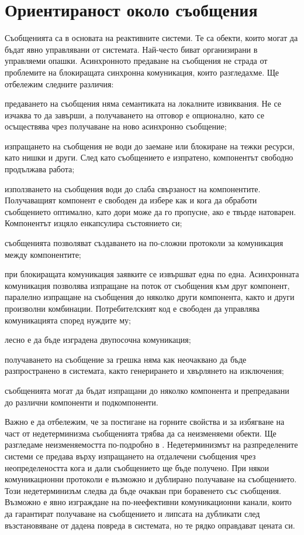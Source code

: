 \section{Ориентираност около съобщения}

Съобщенията са в основата на реактивните системи. Те са обекти, които могат да бъдат явно управлявани от системата. Най-често биват организирани в управляеми опашки. Асинхронното предаване на съобщения не страда от проблемите на блокиращата синхронна комуникация, които разгледахме. Ще отбележим следните различия:

\begin{itemize*}
  \item предаването на съобщения няма семантиката на локалните извиквания. Не се изчаква то да завърши, а получаването на отговор е опционално, като се осъществява чрез получаване на ново асинхронно съобщение;
  \item изпращането на съобщения не води до заемане или блокиране на тежки ресурси, като нишки и други. След като съобщението е изпратено, компонентът свободно продължава работа;
  \item използването на съобщения води до слаба свързаност на компонентите. Получаващият компонент е свободен да избере как и кога да обработи съобщението оптимално, като дори може да го пропусне, ако е твърде натоварен. Компонентът изцяло енкапсулира състоянието си;
  \item съобщенията позволяват създаването на по-сложни протоколи за комуникация между компонентите;
  \item при блокиращата комуникация заявките се извършват една по една. Асинхронната комуникация позволява изпращане на поток от съобщения към друг компонент, паралелно изпращане на съобщения до няколко други компонента, както и други произволни комбинации. Потребителският код е свободен да управлява комуникацията според нуждите му;
  \item лесно е да бъде изградена двупосочна комуникация;
  \item получаването на съобщение за грешка няма как неочаквано да бъде разпространено в системата, както генерирането и хвърлянето на изключения;
  \item съобщенията могат да бъдат изпращани до няколко компонента и препредавани до различни компоненти и подкомпоненти.
\end{itemize*}

Важно е да отбележим, че за постигане на горните свойства и за избягване на част от недетерминизма съобщенията трябва да са неизменяеми обекти. Ще разгледаме неизменяемостта по-подробно в . Недетерминизмът на разпределените системи се предава върху изпращането на отдалечени съобщения чрез неопределеността кога и дали съобщението ще бъде получено. При някои комуникационни протоколи е възможно и дублирано получаване на съобщението. Този недетерминизъм следва да бъде очакван при боравенето със съобщения. Възможно е явно изграждане на по-неефективни комуникационни канали, които да гарантират получаване на съобщението и липсата на дубликати след възстановяване от дадена повреда в системата, но те рядко оправдават цената си.

